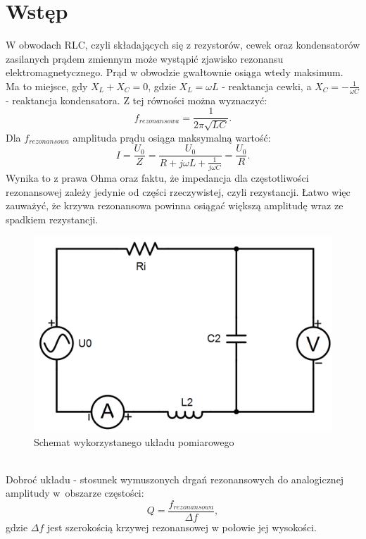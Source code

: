 \documentclass[12pt, a4paper, oneside]{article}
\begin{document}
\section{Wstęp}
\indent\indent W obwodach RLC, czyli składających się z rezystorów, cewek oraz kondensatorów zasilanych prądem zmiennym może wystąpić zjawisko rezonansu elektromagnetycznego. Prąd w obwodzie gwałtownie osiąga wtedy maksimum. Ma to miejsce, gdy $X_L + X_C = 0$, gdzie $X_L =\omega L$ - reaktancja cewki, a $X_C = -\frac{1}{\omega C}$ - reaktancja kondensatora. Z tej równości można wyznaczyć:\\
\begin{equation}
f_{rezonansowa} = \frac{1}{2\pi\sqrt{LC}}.
\end{equation}
Dla $f_{rezonansowa}$ amplituda prądu osiąga maksymalną wartość:
\begin{equation}
I=\frac{U_0}{Z}=\frac{U_0}{R+j\omega L+\frac{1}{j\omega C}}=\frac{U_0}{R}.
\end{equation}
Wynika to z prawa Ohma oraz faktu, że impedancja dla częstotliwości rezonansowej zależy jedynie od części rzeczywistej, czyli rezystancji. Łatwo więc zauważyć, że krzywa rezonansowa powinna osiągać większą amplitudę wraz ze spadkiem rezystancji.
\begin{figure}[h!]
\centering
\caption{Schemat wykorzystanego układu pomiarowego}
\includegraphics[scale=0.35]{f1.png}
\end{figure}
\\\indent Dobroć układu - stosunek wymuszonych drgań rezonansowych do analogicznej amplitudy w~obszarze częstości:
\begin{equation}
Q=\frac{f_{rezonansowa}}{\Delta f},
\end{equation}
gdzie $\Delta f$ jest szerokością krzywej rezonansowej w połowie jej wysokości.
\clearpage
\end{document}
